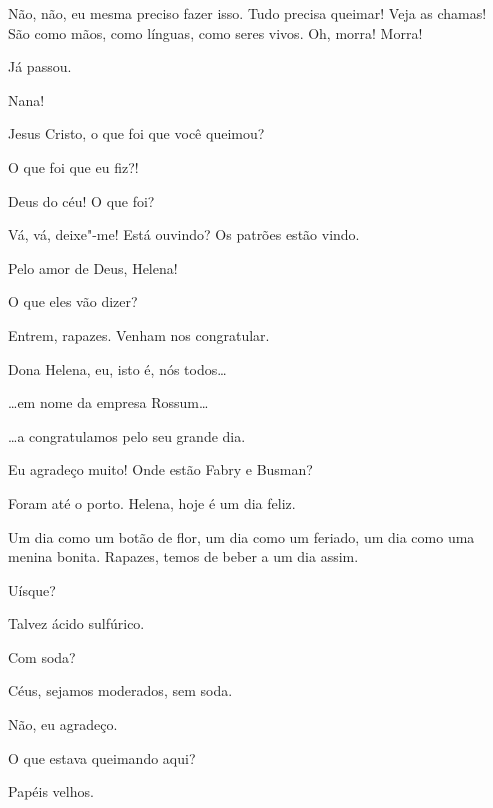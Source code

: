  Não, não, eu mesma preciso fazer isso.  Tudo precisa queimar! Veja as chamas! São como mãos, como línguas,
como seres vivos.  Oh, morra! Morra!

 Já passou.

  Nana!

 Jesus Cristo, o que foi que você queimou?

 O que foi que eu fiz?!

 Deus do céu! O que foi?

 Vá, vá, deixe"-me! Está ouvindo? Os patrões estão vindo.

 Pelo amor de Deus, Helena! 

 O que eles vão dizer?

  Entrem, rapazes. Venham nos
congratular. 

  Dona Helena, eu, isto é, nós todos\ldots{}

 \ldots{}em nome da empresa Rossum\ldots{}

 \ldots{}a congratulamos pelo seu grande dia.

  Eu agradeço muito! Onde estão Fabry e Busman?

 Foram até o porto. Helena, hoje é um dia feliz.

 Um dia como um botão de flor, um dia como um feriado, um dia como
uma menina bonita. Rapazes, temos de beber a um dia assim.

 Uísque?

 Talvez ácido sulfúrico.

 Com soda?

 Céus, sejamos moderados, sem soda.

 Não, eu agradeço.

 O que estava queimando aqui?

 Papéis velhos. 

